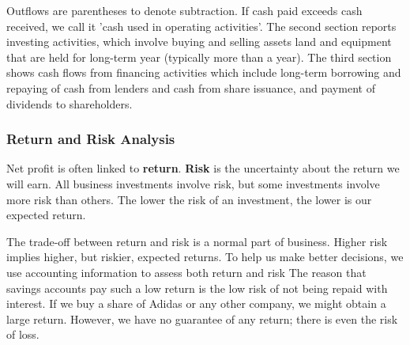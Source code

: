 \documentclass[../main.tex]{subfiles}
\begin{document}
	Outflows are parentheses to denote subtraction. If cash paid exceeds cash 
	received, we call it 'cash used in operating activities'. The second 
	section reports investing activities, which involve buying and selling 
	assets \eg land and equipment that are held for long-term year (typically 
	more than a year). The third section shows cash flows from financing 
	activities which include long-term borrowing and repaying of cash from 
	lenders and cash from share issuance, and payment of dividends to 
	shareholders. 
	
	
	\subsubsection{Return and Risk Analysis}
	
	Net profit is often linked to \textbf{return}. \textbf{Risk} is the 
	uncertainty about the return we will earn. All business investments involve 
	risk, but some investments involve more risk than others. The lower the 
	risk of an investment, the lower is our expected return. 
	
	The trade-off between return and risk is a normal part of business. Higher 
	risk implies higher, but riskier, expected returns. To help us make better 
	decisions, we use accounting information to assess both return and risk \eg 
	The reason that savings accounts pay such a low return is the low risk of 
	not being repaid with interest. If we buy a share of Adidas or any other 
	company, we might obtain a large return. However, we have no guarantee of 
	any return; there is even the risk of loss.
	
\end{document}
